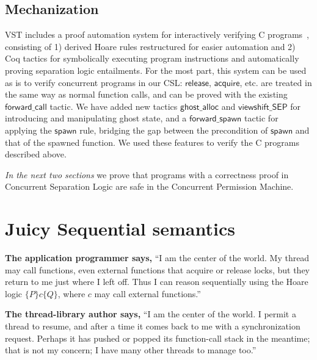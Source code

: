 \subsection{Mechanization}
VST includes a proof automation system for interactively verifying C programs~\cite{DBLP:journals/jar/CaoBGDA18}, consisting of 1) derived Hoare rules restructured for easier automation and 2) Coq tactics for symbolically executing program instructions and automatically proving separation logic entailments. For the most part, this system can be used as is to verify concurrent programs in our CSL: $\mathsf{release}$, $\mathsf{acquire}$, etc. are treated in the same way as normal function calls, and can be proved with the existing $\mathsf{forward\_call}$ tactic. We have added new tactics $\mathsf{ghost\_alloc}$ and $\mathsf{viewshift\_SEP}$ for introducing and manipulating ghost state, and a $\mathsf{forward\_spawn}$ tactic for applying the $\mathsf{spawn}$ rule, bridging the gap between the precondition of $\mathsf{spawn}$ and that of the spawned function.
We used these features to verify the C programs described above.

\vspace{1ex}
\emph{In the next two sections}
we prove that programs with a correctness proof in Concurrent Separation Logic are
safe in the Concurrent Permission Machine.  

\section{Juicy Sequential semantics}
\label{sec:juicyseq}


\noindent
\begin{minipage}[t]{2.6in}
  \noindent \textbf{The application programmer says,}
  ``I am the center of the world.  
  My thread may call functions,
  even external functions that acquire or release locks,
  but they return to me just where I left off.
  Thus I can reason sequentially using the
  Hoare logic $\{P\}c\{Q\}$, where
  $c$ may call external functions.''
  \end{minipage}\hfill
\begin{minipage}[t]{2.6in}
  \noindent \textbf{The thread-library author says,}
  ``I am the center of the world.  I permit
  a thread to resume, and after a time it comes
  back to me with a synchronization request.  Perhaps
  it has pushed or popped its function-call stack
  in the meantime; that is not my concern; I have
  many other threads to manage too.''
  \end{minipage}

